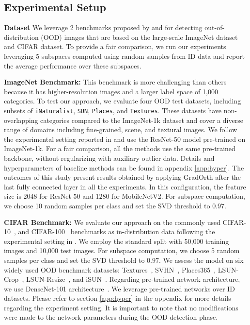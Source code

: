 \documentclass{article}
\begin{document}
\subsection{Experimental Setup}
\label{sec:exp_setup}
\vspace{-0.2cm}
\textbf{Dataset} 
We leverage 2 benchmarks proposed by \cite{huang2021mos} and \cite{djurisic2022extremely} for detecting out-of-distribution (OOD) images that are based on the large-scale ImageNet dataset and CIFAR dataset. To provide a fair comparison, we run our experiments leveraging 5 subspaces computed using random samples from ID data and report the average performance over these subspaces.

\textbf{ImageNet Benchmark:} This benchmark is more challenging than others because it has higher-resolution images and a larger label space of 1,000 categories. To test our approach, we evaluate four OOD test datasets, including subsets of \texttt{iNaturalist}\cite{van2018inaturalist}, \texttt{SUN}\cite{xiao2010sun}, \texttt{Places}\cite{zhou2017places}, and \texttt{Textures}\cite{cimpoi2014describing}. These datasets have non-overlapping categories compared to the ImageNet-1k dataset and cover a diverse range of domains including fine-grained, scene, and textural images. We follow the experimental setting reported in \cite{djurisic2022extremely} and use the ResNet-50 model \cite{he2016deep} pre-trained on ImageNet-1k.  For a fair comparison, all the methods use the same pre-trained backbone, without regularizing with auxiliary
outlier data. Details and hyperparameters of baseline methods can be found in appendix \ref{app:hyper}.  
The outcomes of this study present results obtained by applying GradOrth after the last fully connected layer in all the experiments. In this configuration, the feature size is $2048$ for ResNet-50 and $1280$ for MobileNetV2. For subspace computation, we choose 10 random samples per class and set the SVD threshold to $0.97$. 

\textbf{CIFAR Benchmark:} We evaluate our approach on the commonly used  CIFAR-10~\cite{krizhevsky2009learning}, and CIFAR-100~\cite{krizhevsky2009learning} benchmarks as in-distribution data following the experimental setting in \cite{djurisic2022extremely,sun2022out}. We employ the standard split with 50,000 training images and 10,000 test images. For subspace computation, we choose 5 random samples per class and set the SVD threshold to $0.97$. We assess the model on six widely used OOD benchmark datasets: Textures~\cite{cimpoi2014describing}, SVHN~\cite{netzer2011reading}, Places365~\cite{zhou2017places}, LSUN-Crop~\cite{yu2015lsun}, LSUN-Resize~\cite{yu2015lsun}, and iSUN~\cite{xu2015turkergaze}. Regarding pre-trained network architecture, we use DenseNet-101 architecture~\cite{huang2017densely}. We leverage pre-trained networks over ID datasets. Please refer to section \ref{app:hyper} in the appendix for more details regarding the experiment setting. 
 It is important to note that no modifications were made to the network parameters during the OOD detection phase.
\end{document}

